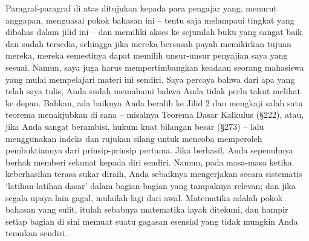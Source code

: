Paragraf-paragraf di atas ditujukan kepada para pengajar yang, menurut
anggapan, menguasai pokok bahasan ini -- tentu saja melampaui tingkat
yang dibahas dalam jilid ini -- dan memiliki akses ke sejumlah buku
yang sangat baik dan sudah tersedia, sehingga jika mereka bersusah payah
memikirkan tujuan mereka, mereka semestinya dapat memilih unsur-unsur
penyajian saya yang sesuai. Namun, saya juga harus mempertimbangkan
keadaan seorang mahasiswa yang mulai mempelajari materi ini sendiri.
Saya percaya bahwa dari apa yang telah saya tulis, Anda sudah memahami
bahwa Anda tidak perlu takut melihat ke depan. Bahkan, ada baiknya Anda
beralih ke Jilid 2 dan mengkaji salah satu teorema menakjubkan di
sana -- misalnya Teorema Dasar Kalkulus (\S222), atau, jika Anda sangat
berambisi, hukum kuat bilangan besar (\S273) -- lalu menggunakan indeks
dan rujukan silang untuk mencoba memperoleh pembuktiannya dari
prinsip-prinsip pertama. Jika berhasil, Anda sepenuhnya berhak memberi
selamat kepada diri sendiri. Namun, pada masa-masa ketika keberhasilan
terasa sukar diraih, Anda sebaiknya mengerjakan secara sistematis
`latihan-latihan dasar' dalam bagian-bagian yang tampaknya relevan; dan
jika segala upaya lain gagal, mulailah lagi dari awal. Matematika adalah
pokok bahasan yang sulit, itulah sebabnya matematika layak ditekuni, dan
hampir setiap bagian di sini memuat suatu gagasan esensial yang tidak
mungkin Anda temukan sendiri.

\frnewpage
